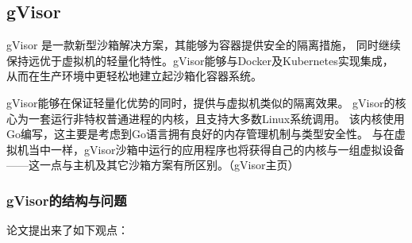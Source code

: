 \documentclass[AutoFakeBold,a4paper]{ctexart}
\begin{document}
\subsection{gVisor}
gVisor 是一款新型沙箱解决方案，其能够为容器提供安全的隔离措施，
同时继续保持远优于虚拟机的轻量化特性。gVisor能够与Docker及Kubernetes实现集成，
从而在生产环境中更轻松地建立起沙箱化容器系统。

gVisor能够在保证轻量化优势的同时，提供与虚拟机类似的隔离效果。
gVisor的核心为一套运行非特权普通进程的内核，且支持大多数Linux系统调用。
该内核使用Go编写，这主要是考虑到Go语言拥有良好的内存管理机制与类型安全性。
与在虚拟机当中一样，gVisor沙箱中运行的应用程序也将获得自己的内核与一组虚拟设备
——这一点与主机及其它沙箱方案有所区别。（gVisor主页）

\subsubsection{gVisor的结构与问题}

论文\cite{234857}提出来了如下观点：
\end{document}

